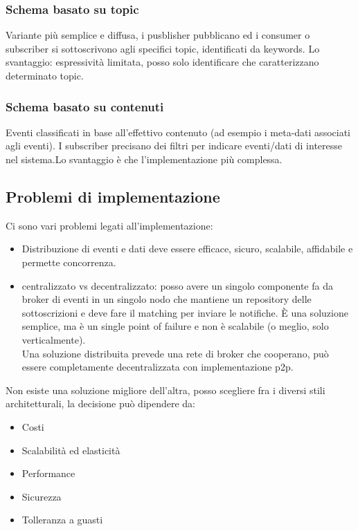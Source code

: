 \documentclass[16px]{article}
\begin{document}
\subsubsection{Schema basato su topic}
Variante più semplice e diffusa, i pusblisher pubblicano ed i consumer o subscriber si sottoscrivono agli specifici topic, identificati da keywords. Lo svantaggio: espressività limitata, posso solo identificare che caratterizzano determinato topic.
\subsubsection{Schema basato su contenuti}
Eventi classificati in base all'effettivo contenuto (ad esempio i meta-dati associati agli eventi). I subscriber precisano dei filtri per indicare eventi/dati di interesse nel sistema.Lo svantaggio è che l'implementazione più complessa.
\subsection{Problemi di implementazione}
Ci sono vari problemi legati all'implementazione:
\begin{itemize}
\item Distribuzione di eventi e dati deve essere efficace,  sicuro, scalabile, affidabile e permette concorrenza.
\item centralizzato vs decentralizzato: posso avere un singolo componente fa da broker di eventi in un singolo nodo che mantiene un repository delle sottoscrizioni e deve fare il matching per inviare le notifiche. È una soluzione semplice, ma è un single point of failure e non è scalabile (o meglio, solo verticalmente).\\Una soluzione distribuita prevede una rete di broker che cooperano, può essere completamente decentralizzata con implementazione p2p.
\end{itemize}
Non esiste una soluzione migliore dell'altra, posso scegliere fra i diversi stili architetturali, la decisione può dipendere da:
\begin{itemize}
\item Costi
\item Scalabilità ed elasticità
\item Performance
\item Sicurezza
\item Tolleranza a guasti
\end{itemize}
\end{document}
